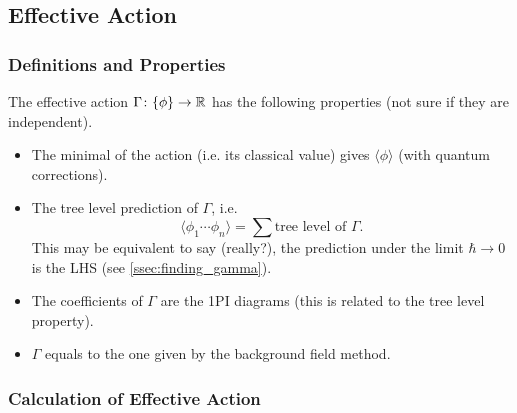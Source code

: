 \documentclass{article}
\begin{document}
\subsection{Effective Action}

\subsubsection{Definitions and Properties}

The effective action $\Gamma\colon \qty{\phi} \to \mathbb{R}$ has the following properties (not sure if they are independent).
\begin{itemize}
    \item The minimal of the action (i.e. its classical value) gives $\langle \phi \rangle$ (with quantum corrections).
    \item The tree level prediction of $\Gamma$, i.e.
    \[ \langle \phi_1 \cdots \phi_n \rangle = \sum \text{tree level of }\Gamma. \]
    This may be equivalent to say (really?), the prediction under the limit $\hbar \rightarrow 0$ is the LHS (see \cref{ssec:finding_gamma}).
    \item The coefficients of $\Gamma$ are the 1PI diagrams (this is related to the tree level property).
    \item $\Gamma$ equals to the one given by the background field method.
\end{itemize}

\subsubsection{Calculation of Effective Action}
\end{document}
